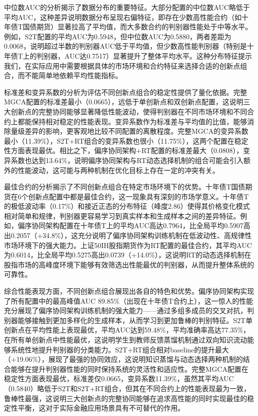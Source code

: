 中位数AUC的分析揭示了数据分布的重要特征。大部分配置的中位数AUC略低于平均AUC，这种差异说明数据分布呈现右偏特征，即存在少数高性能合约（如十年债T国债期货）显著拉高了平均值，而大多数合约的判别器性能处于中等水平。例如，S2T配置的平均AUC为0.5948，但中位数AUC为0.5880，两者差距为0.0068，说明超过半数的判别器AUC低于平均值，但少数高性能判别器（特别是十年债T上的判别器，AUC达0.7517）显著提升了整体平均水平。这种分布特征提示我们，在实际应用中需要根据具体的市场环境和合约特征来选择合适的创新点组合，而不能简单地依赖平均性能指标。

标准差和变异系数的分析为评估不同创新点组合的稳定性提供了量化依据。完整MGCA配置的标准差最小（0.0665），远低于单创新点和双创新点配置，这说明三大创新点的完整协同能够显著降低性能波动，使得判别器在不同市场环境和不同合约上都能保持相对稳定的性能表现。变异系数作为标准差与平均值的比值，能够消除量级差异的影响，更客观地比较不同配置的离散程度。完整MGCA的变异系数最小（11.39\%），S2T+RT组合的变异系数也很小（11.75\%），这两个配置在稳定性方面表现最优。相比之下，偏序协同架构+RT配置的标准差最大（0.0808），变异系数也达到13.64\%，说明偏序协同架构与RT动态选择机制的组合可能会引入额外的性能波动，这可能与两种机制在优化目标上存在一定的冲突有关。

最佳合约的分析揭示了不同创新点组合在特定市场环境下的优势。十年债T国债期货在6个创新点配置中都是最佳合约，这一现象具有深刻的市场学意义。十年债T的极低波动率（0.17\%）和接近正态的分布特征（峰度2.86）使得其价格变化模式相对简单和规律，判别器更容易学习到真实样本和生成样本之间的差异特征。例如，偏序协同架构配置在十年债T上的平均AUC高达0.7964，比全局平均0.5907高出0.2057（+34.8\%），这充分说明了偏序协同架构训练机制在低波动性、高规律性市场环境下的强大能力。上证50IH股指期货作为RT配置的最佳合约，其平均AUC为0.6014，比全局平均0.5275高出0.0739（+14.0\%），这说明RT的动态选择机制在股指市场的高峰度环境下能够有效筛选出性能最优的判别器，从而提升整体系统的可靠性。

综合性能表现方面，不同创新点组合展现出各自的特色和优势。偏序协同架构实现了所有配置中的最高峰值AUC 89.85\%（出现在十年债T合约上），这一惊人的性能充分展现了偏序协同架构训练机制的强大能力——通过多组多成员的交叉对抗，判别器能够接触到更加多样化的生成样本，从而学习到更加鲁棒的判别特征。S2T单创新点在平均性能上表现最优，平均AUC达到59.48\%，平均准确率高达77.35\%，在所有单创新点中性能最优，这说明学生到教师反馈蒸馏机制通过双向知识流动能够系统性地提升判别器的分类能力。S2T+RT组合相对baseline的提升最大（+19.06\%），展现了最强的协同效应，这说明知识蒸馏与动态选择两种机制的结合能够在提升判别器性能的同时保持系统的灵活性和适应性。完整MGCA配置在稳定性方面表现最优，标准差仅0.0665，变异系数11.39\%，虽然其平均AUC（0.5840）略低于S2T和S2T+RT组合，但其在不同合约上的性能表现最为一致，鲁棒性最强，这说明三大创新点的完整协同能够在追求高性能的同时实现最佳的稳定性平衡，这对于实际金融应用场景具有不可替代的作用。


